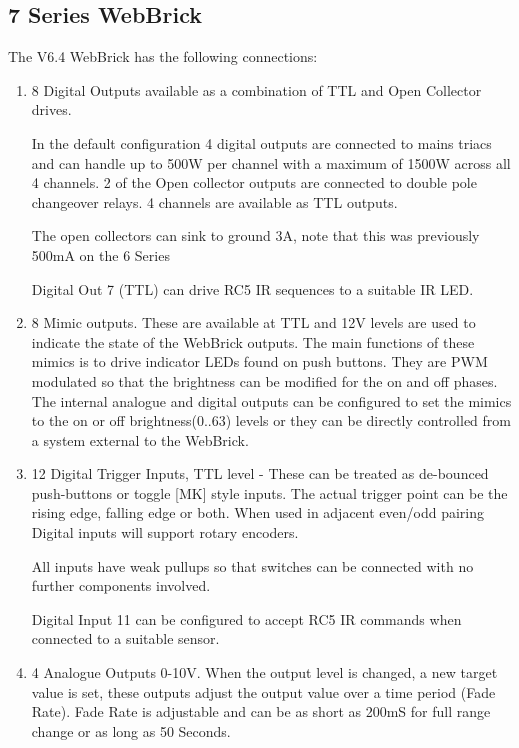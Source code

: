 \subsection {7 Series WebBrick}

The V6.4 WebBrick has the following connections:


\begin{enumerate}

\item
8 Digital Outputs available as a combination of TTL and Open Collector drives.

In the default configuration 4 digital outputs are connected to mains triacs and can handle up to 500W 
per channel with a maximum of 1500W across all 4 channels. 2 of the Open collector outputs are connected to double pole 
changeover relays. 4 channels are available as TTL outputs.

The open collectors can sink to ground 3A, note that this was previously 500mA on the 6 Series

Digital Out 7 (TTL) can drive RC5 IR sequences to a suitable IR LED.

\item
8 Mimic outputs.  These are available at TTL and 12V levels are used to indicate the state of the WebBrick outputs.
The main functions of these mimics is to drive indicator LEDs found on push buttons. They are PWM modulated so that the
brightness can be modified for the on and off phases. The internal analogue and digital outputs can be configured to set 
the mimics to the on or off brightness(0..63) levels or they can be directly controlled from a system external to the WebBrick.

\item
12 Digital Trigger Inputs, TTL level - These can be treated as de-bounced push-buttons or toggle [MK] style inputs.  
The actual trigger point can be the rising edge, falling edge or both. When used in adjacent even/odd pairing Digital inputs will support 
rotary encoders.

All inputs have weak pullups so that switches can be connected with no further components involved.

Digital Input 11 can be configured to accept RC5 IR commands when connected to a suitable sensor.

\item
4 Analogue Outputs 0-10V. When the output level is changed, a new target value is set, these outputs 
adjust the output value over a time period (Fade Rate). Fade Rate is adjustable and can be as short as 200mS for full range 
change or as long as 50 Seconds.


\end{enumerate}
